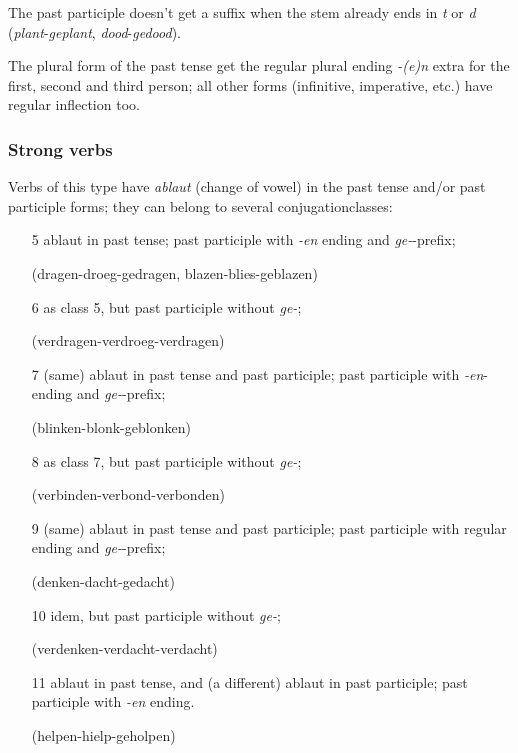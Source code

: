 The past participle doesn't get a suffix when the stem already ends in {\em t}
or {\em d} ({\em plant}-{\em geplant}, {\em dood}-{\em gedood}).

The plural form of the past tense get the regular plural ending {\em -(e)n} 
extra for the first, second and third person; all 
other forms (infinitive, imperative, etc.) have regular inflection too.


\subsubsection{Strong verbs}
Verbs of this type have {\em ablaut} (change of vowel) in the past tense and/or
past participle forms; they can belong to several conjugationclasses:

\begin{itemize}
  \item [5] ablaut in past tense; past participle with {\em -en} ending and 
        {\em ge-}-prefix;

        (dragen-droeg-gedragen, blazen-blies-geblazen)

  \item [6] as class 5, but past participle without {\em ge-}; 

        (verdragen-verdroeg-verdragen)

  \item [7] (same) ablaut in past tense and past participle; past participle 
        with {\em -en}-ending and {\em ge-}-prefix;

        (blinken-blonk-geblonken)
  \item [8] as class 7, but past participle without {\em ge-}; 

        (verbinden-verbond-verbonden)

  \item [9] (same) ablaut in past tense and past participle; past participle 
        with regular ending and {\em ge-}-prefix;

        (denken-dacht-gedacht)

  \item [10] idem, but past participle without  {\em ge-};

        (verdenken-verdacht-verdacht)

  \item [11] ablaut in past tense, and (a different) ablaut  in past participle;
        past participle with {\em -en} ending. 

        (helpen-hielp-geholpen)


\end{itemize}
